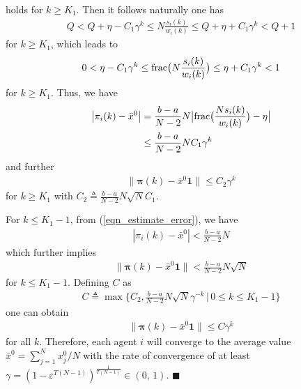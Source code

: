 \documentclass{IEEEtran}
\begin{document}
holds for $k \geq K_1$. Then it follows naturally one has
\begin{equation}
	\begin{aligned}
		Q<Q+\eta-C_1 \gamma^k \leq N \frac{s_i(k)}{w_i(k)} \leq Q+\eta+C_1 \gamma^k < Q+1
	\end{aligned}
\end{equation}
for $k \geq K_1$, which leads to
\begin{equation}
	\begin{aligned}
		0< \eta-C_1 \gamma^k \leq {\rm frac}\big(N \frac{s_i(k)}{w_i(k)}\big) \leq \eta+C_1 \gamma^k < 1
	\end{aligned}
\end{equation}
for $k \geq K_1$. Thus, we have
\begin{equation}\label{eqn_estimate_error_2}
	\begin{aligned}
		\big| \pi_i(k)-\bar{x}^0 \big| 
		& = \frac{b-a}{N-2}N\big|{\rm frac}\big(\frac{Ns_i(k)}{w_i(k)} \big) - \eta \big| \\
		& \leq \frac{b-a}{N-2}N C_1 \gamma^k
	\end{aligned}
\end{equation}
and further
\begin{equation}\label{eqn_estimate_error_3}
	\begin{aligned}
		\big\| \boldsymbol{\pi}(k)-\bar{x}^0\mathbf{1} \big\| \leq C_2 \gamma^k
	\end{aligned}
\end{equation}
for $k \geq K_1$ with $C_2 \triangleq \frac{b-a}{N-2}N \sqrt{N} C_1$.

For $k \leq K_1-1$, from (\ref{eqn_estimate_error}), we have
\begin{equation}
	\begin{aligned}
		|\pi_i(k)-\bar{x}^0| < \frac{b-a}{N-2}N
	\end{aligned}
\end{equation}
which further implies
\begin{equation}
	\begin{aligned}
		\|\boldsymbol{\pi}(k)-\bar{x}^0\mathbf{1} \| < \frac{b-a}{N-2}N\sqrt{N}
	\end{aligned}
\end{equation}
for $k \leq K_1-1$. Defining $C$ as
\begin{equation}\label{C}
	\begin{aligned}
		C \triangleq \max \big\{C_2, \frac{b-a}{N-2}N \sqrt{N} \gamma^{-k} \, \big| \, 0 \leq k \leq K_1-1 \big\}
	\end{aligned}
\end{equation}
one can obtain
\begin{equation}\label{pi_alpha__vector_all}
	\begin{aligned}
		\big\|\boldsymbol{\pi}(k) - \bar{x}^0 \mathbf{1} \big\| \leq C \gamma^{k}
	\end{aligned}
\end{equation}
for all $k$. Therefore, each agent $i$ will converge to the average value $\bar{x}^0={\sum_{j=1}^{N}x_j^0}/N$ with the rate of convergence of at least $\gamma= (1-\varepsilon^{T(N-1)})^{\frac{1}{T(N-1)}} \in (0, \, 1)$. \hfill{$\blacksquare$}
\end{document}

